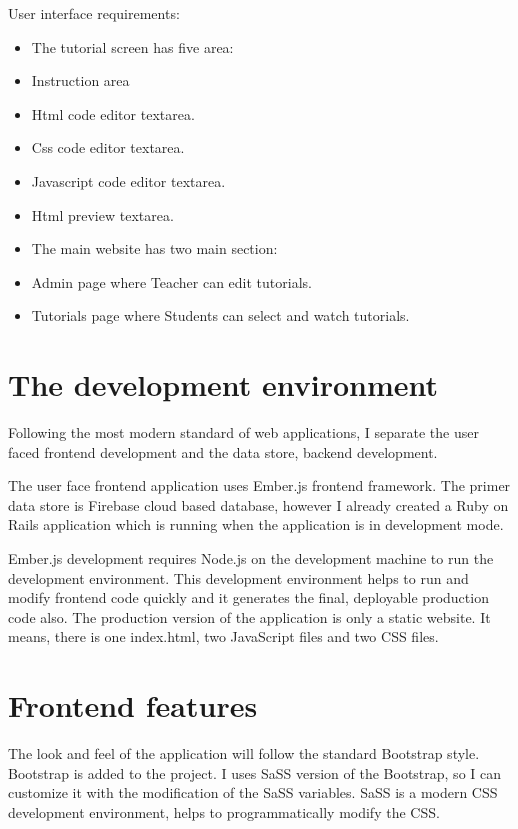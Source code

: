 User interface requirements:
\begin{itemize}
\item The tutorial screen has five area:
\item Instruction area
\item Html code editor textarea.
\item Css code editor textarea.
\item Javascript code editor textarea.
\item Html preview textarea.
\item The main website has two main section:
\item Admin page where Teacher can edit tutorials.
\item Tutorials page where Students can select and watch tutorials.
\end{itemize}

\section{The development environment}

Following the most modern standard of web applications, I separate the user faced frontend development and the data store, backend development.

The user face frontend application uses Ember.js frontend framework. The primer data store is Firebase cloud based database, however I already created a Ruby on Rails application which is running when the application is in development mode.

Ember.js development requires Node.js on the development machine to run the development environment. This development environment helps to run and modify frontend code quickly and it generates the final, deployable production code also. The production version of the application is only a static website. It means, there is one index.html, two JavaScript files and two CSS files.

\section{Frontend features}

The look and feel of the application will follow the standard Bootstrap style. Bootstrap is added to the project. I uses SaSS version of the Bootstrap, so I can customize it with the modification of the SaSS variables. SaSS is a modern CSS development environment, helps to programmatically modify the CSS.

